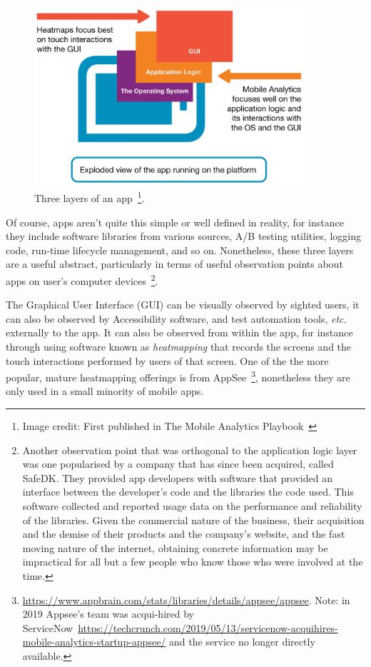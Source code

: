 \begin{figure}[ht]
    \begin{minipage}{\textwidth}
    \centering
    \includegraphics[width=10cm]{images/mobile-analytics-playbook/3-layers.png}
    \caption[Three layers of an app]{Three layers of an app~\footnote{Image credit: First published in The Mobile Analytics Playbook~\citep{harty_aymer_playbook_2016}}.}
    \label{fig:3-layers}
    \end{minipage}
\end{figure}

Of course, apps aren't quite this simple or well defined in reality, for instance they include software libraries from various sources, A/B testing utilities, logging code, run-time lifecycle management, and so on. Nonetheless, these three layers are a useful abstract, particularly in terms of useful observation points about apps on user's computer devices~\footnote{Another observation point that was orthogonal to the application logic layer was one popularised by a company that has since been acquired, called SafeDK. They provided app developers with software that provided an interface between the developer's code and the libraries the code used. This software collected and reported usage data on the performance and reliability of the libraries. Given the commercial nature of the business, their acquisition and the demise of their products and the company's website, and the fast moving nature of the internet, obtaining concrete information may be impractical for all but a few people who know those who were involved at the time.}.

The Graphical User Interface (GUI) %
can be visually observed by sighted users, it can also be observed by Accessibility software, and test automation tools, \emph{etc.} externally to the app. It can also be observed from within the app, for instance through using software known as \emph{heatmapping} that records the screens and the touch interactions performed by users of that screen. One of the the more popular, mature heatmapping offerings is from AppSee~\footnote{\url{  https://www.appbrain.com/stats/libraries/details/appsee/appsee}. Note: in 2019 Appsee's team was acqui-hired by ServiceNow~\url{https://techcrunch.com/2019/05/13/servicenow-acquihires-mobile-analytics-startup-appsee/} and the service no longer directly available.}, nonetheless they are only used in a small minority of mobile apps.



